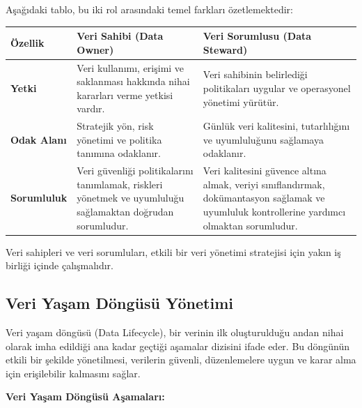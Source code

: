 Aşağıdaki tablo, bu iki rol arasındaki temel farkları özetlemektedir:

\begin{center}
\begin{tabular}{|p{4cm}|p{6cm}|p{4cm}|}
\hline
\hline
\textbf{Özellik} & \textbf{Veri Sahibi (Data Owner)} & \textbf{Veri Sorumlusu (Data Steward)} \\
\hline
\hline
\textbf{Yetki} & Veri kullanımı, erişimi ve saklanması hakkında nihai kararları verme yetkisi vardır. & Veri sahibinin belirlediği politikaları uygular ve operasyonel yönetimi yürütür. \\
\hline
\hline
\textbf{Odak Alanı} & Stratejik yön, risk yönetimi ve politika tanımına odaklanır. & Günlük veri kalitesini, tutarlılığını ve uyumluluğunu sağlamaya odaklanır. \\
\hline
\hline
\textbf{Sorumluluk} & Veri güvenliği politikalarını tanımlamak, riskleri yönetmek ve uyumluluğu sağlamaktan doğrudan sorumludur. & Veri kalitesini güvence altına almak, veriyi sınıflandırmak, dokümantasyon sağlamak ve uyumluluk kontrollerine yardımcı olmaktan sorumludur. \\
\hline
\hline
\hline
\end{tabular}
\end{center}

Veri sahipleri ve veri sorumluları, etkili bir veri yönetimi stratejisi için yakın iş birliği içinde çalışmalıdır.

\subsection{Veri Yaşam Döngüsü Yönetimi}

Veri yaşam döngüsü (Data Lifecycle), bir verinin ilk oluşturulduğu andan nihai olarak imha edildiği ana kadar geçtiği aşamalar dizisini ifade eder. Bu döngünün etkili bir şekilde yönetilmesi, verilerin güvenli, düzenlemelere uygun ve karar alma için erişilebilir kalmasını sağlar.

\textbf{Veri Yaşam Döngüsü Aşamaları:}

